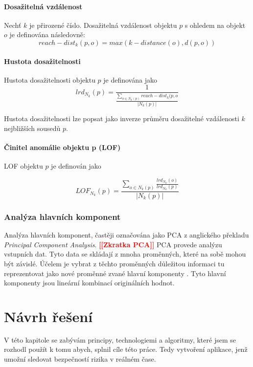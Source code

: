 \documentclass[thesis=M,czech]{FITthesis}[2012/10/20]
\newcommand{\todo}[1]{\textcolor{red}{\textbf{[[#1]]}}}
\begin{document}
			\subsubsection{Dosažitelná vzdálenost}
				Nechť $k$ je přirozené číslo. Dosažitelná vzdálenost objektu $p$ s ohledem na objekt $o$ je definována následovně: 
				$$ reach-dist_k(p, o) = max (k-distance(o), d(p, o)) $$
				
			\subsubsection{Hustota dosažitelnosti}
				Hustota dosažitelnosti objektu $p$ je definována jako
				$$ lrd_{N_k}(p) = \frac{1}{ \frac{\sum_{o \in N_k(p)} reach-dist_k(p,o}{|N_k(p)|}} $$
				
				Hustota dosažitelnosti lze popsat jako inverze průměru dosažitelné vzdálenosti $k$ nejbližších sousedů $p$.
				
			\subsubsection{Činitel anomálie objektu p (LOF)}
				LOF objektu $p$ je definován jako 
				
				$$LOF_{N_k}(p) = \frac{\sum_{o \in N_k(p)} \frac{lrd_{N_k}(o)}{lrd_{N_k}(p)}}{|N_k(p)|} $$
			
			
		
		
		\subsection{Analýza hlavních komponent}
		\label{sec:pca}
		Analýza hlavních komponent, častěji označována jako PCA z anglického překladu \textit{Principal Component Analysis}. \todo{Zkratka PCA} PCA provede analýzu vstupních dat. Tyto data se skládají z mnoha proměnných, které na sobě mohou být závislé. Účelem je vybrat z těchto proměnných důležitou informaci tu reprezentovat jako nové proměnné zvané hlavní komponenty \cite{PCA_book}. Tyto hlavní komponenty jsou lineární kombinací originálních hodnot.
		
	

\chapter{Návrh řešení}
	V této kapitole se zabývám principy, technologiemi a algoritmy, které jsem se rozhodl použít k tomu abych, splnil cíle této práce. Tedy vytvoření aplikace, jenž umožní sledovat bezpečností rizika v reálném čase.
	
\end{document}
